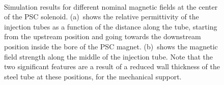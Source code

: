 \begin{refsection}
        \begin{figure}
            \centering
            \\
            \caption{Simulation results for different nominal magnetic fields at the center of the PSC solenoid. (a)~shows the relative permittivity of the injection tubes as a function of the distance along the tube, starting from the upstream position and going towards the downstream position inside the bore of the PSC magnet. (b)~shows the magnetic field strength along the middle of the injection tube. Note that the two significant features are a result of a reduced wall thickness of the steel tube at these positions, for the mechanical support.}
            \label{fig:TB2023FieldStrengthTubes}
        \end{figure}	
        \begin{figure}
            \centering
            \\

\end{figure}
\end{refsection}
